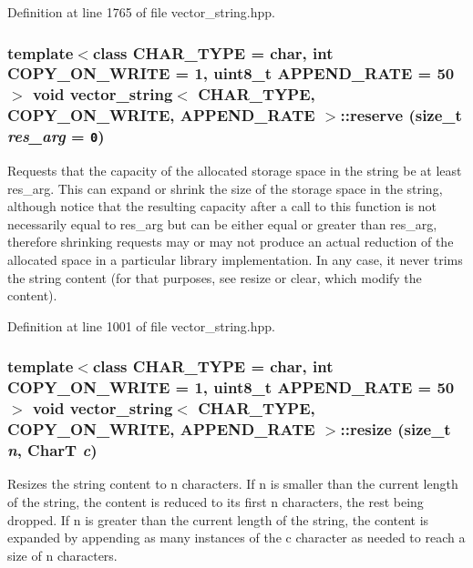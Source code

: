 Definition at line 1765 of file vector\_\-string.hpp.\hypertarget{classvector__string_6499804dfd9b47e4fd747ccd982c20eb}{
\subsubsection[{reserve}]{\setlength{\rightskip}{0pt plus 5cm}template$<$class CHAR\_\-TYPE  = char, int COPY\_\-ON\_\-WRITE = 1, uint8\_\-t APPEND\_\-RATE = 50$>$ void {\bf vector\_\-string}$<$ CHAR\_\-TYPE, COPY\_\-ON\_\-WRITE, APPEND\_\-RATE $>$::reserve (size\_\-t {\em res\_\-arg} = {\tt 0})}}
\label{classvector__string_6499804dfd9b47e4fd747ccd982c20eb}


Requests that the capacity of the allocated storage space in the string be at least res\_\-arg. This can expand or shrink the size of the storage space in the string, although notice that the resulting capacity after a call to this function is not necessarily equal to res\_\-arg but can be either equal or greater than res\_\-arg, therefore shrinking requests may or may not produce an actual reduction of the allocated space in a particular library implementation. In any case, it never trims the string content (for that purposes, see resize or clear, which modify the content). 

Definition at line 1001 of file vector\_\-string.hpp.\hypertarget{classvector__string_dd247a6af30053ac812a485ba12d9369}{
\subsubsection[{resize}]{\setlength{\rightskip}{0pt plus 5cm}template$<$class CHAR\_\-TYPE  = char, int COPY\_\-ON\_\-WRITE = 1, uint8\_\-t APPEND\_\-RATE = 50$>$ void {\bf vector\_\-string}$<$ CHAR\_\-TYPE, COPY\_\-ON\_\-WRITE, APPEND\_\-RATE $>$::resize (size\_\-t {\em n}, \/  CharT {\em c})}}
\label{classvector__string_dd247a6af30053ac812a485ba12d9369}


Resizes the string content to n characters. If n is smaller than the current length of the string, the content is reduced to its first n characters, the rest being dropped. If n is greater than the current length of the string, the content is expanded by appending as many instances of the c character as needed to reach a size of n characters.

